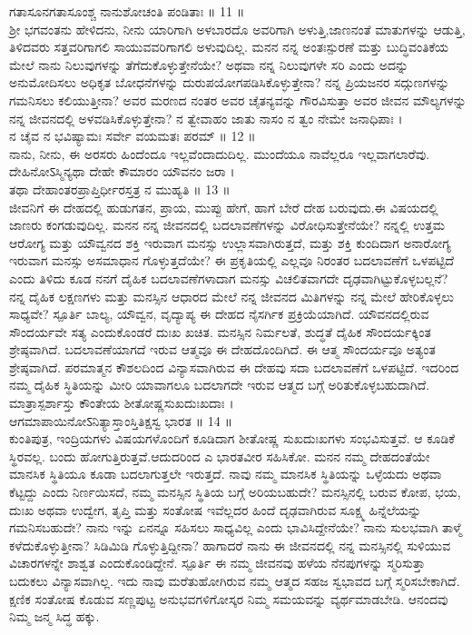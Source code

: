 ಗತಾಸೂನಗತಾಸೂಂಶ್ಚ ನಾನುಶೋಚಂತಿ ಪಂಡಿತಾಃ ॥ 11 ॥\\
 ಶ್ರೀ ಭಗವಂತನು ಹೇಳಿದನು,
 ನೀನು ಯಾರಿಗಾಗಿ ಅಳಬಾರದೊ ಅವರಿಗಾಗಿ ಅಳುತ್ತಿ,ಜಾಣನಂತೆ ಮಾತುಗಳನ್ನು ಆಡುತ್ತಿ, ತಿಳಿದವರು ಸತ್ತವರಿಗಾಗಲಿ ಸಾಯುವವರಿಗಾಗಲಿ ಅಳುವುದಿಲ್ಲ.
ಮನನ 
 ನನ್ನ ಅಂತಃಸ್ಪುರಣೆ ಮತ್ತು ಬುದ್ಧಿವಂತಿಕೆಯ ಮೇಲೆ ನಾನು ನಿಲುವುಗಳನ್ನು ತೆಗೆದುಕೊಳ್ಳುತ್ತೇನೆಯೇ? ಅಥವಾ ನನ್ನ ನಿಲುವುಗಳೇ ಸರಿ ಎಂದು ಅದನ್ನು ಅನುಮೋದಿಸಲು ಅಧಿಕೃತ ಬೋಧನೆಗಳನ್ನು ದುರುಪಯೋಗಪಡಿಸಿಕೊಳ್ಳುತ್ತೇನಾ?
   ನನ್ನ ಪ್ರಿಯಜನರ ಸದ್ಗುಣಗಳನ್ನು ಗಮನಿಸಲು ಕಲಿಯುತ್ತೀನಾ? ಅವರ ಮರಣದ ನಂತರ ಅವರ ಚೈತನ್ಯವನ್ನು ಗೌರವಿಸುತ್ತಾ ಅವರ ಜೀವನ ಮೌಲ್ಯಗಳನ್ನು ನನ್ನ ಜೀವನದಲ್ಲಿ ಅಳವಡಿಸಿಕೊಳ್ಳುತ್ತೇನಾ? 
ನ ತ್ವೇವಾಹಂ ಜಾತು ನಾಸಂ ನ ತ್ವಂ ನೇಮೇ ಜನಾಧಿಪಾಃ ।\\
ನ ಚೈವ ನ ಭವಿಷ್ಯಾಮಃ ಸರ್ವೇ ವಯಮತಃ ಪರಮ್ ॥ 12 ॥\\
 ನಾನು, ನೀನು, ಈ ಅರಸರು ಹಿಂದೆಂದೂ ಇಲ್ಲವೆಂದಾದುದಿಲ್ಲ. ಮುಂದೆಯೂ ನಾವೆಲ್ಲರೂ ಇಲ್ಲವಾಗಲಾರೆವು.
ದೇಹಿನೋऽಸ್ಮಿನ್ಯಥಾ ದೇಹೇ ಕೌಮಾರಂ ಯೌವನಂ ಜರಾ ।\\
ತಥಾ ದೇಹಾಂತರಪ್ರಾಪ್ತಿರ್ಧೀರಸ್ತತ್ರ ನ ಮುಹ್ಯತಿ ॥ 13 ॥\\
 ಜೀವನಿಗೆ ಈ ದೇಹದಲ್ಲಿ ಹುಡುಗತನ, ಪ್ರಾಯ, ಮುಪ್ಪು ಹೇಗೆ, ಹಾಗೆ ಬೇರೆ ದೇಹ ಬರುವುದು.ಈ ವಿಷಯದಲ್ಲಿ ಜಾಣರು ಕಂಗಡುವುದಿಲ್ಲ.
ಮನನ 
 ನನ್ನ ಜೀವನದಲ್ಲಿ ಬದಲಾವಣೆಗಳನ್ನು ವಿರೋಧಿಸುತ್ತೇನೆಯೇ? ನನ್ನಲ್ಲಿ ಉತ್ತಮ ಆರೋಗ್ಯ ಮತ್ತು ಯೌವ್ವನದ ಶಕ್ತಿ ಇರುವಾಗ ಮನಸ್ಸು ಉಲ್ಲಾಸವಾಗಿರುತ್ತದೆ, ಮತ್ತು ಶಕ್ತಿ ಕುಂದಿದಾಗ ಅನಾರೋಗ್ಯ ಇರುವಾಗ ಮನಸ್ಸು ಅಸಮಾಧಾನ ಗೊಳ್ಳುತ್ತದೆಯೇ? ಈ ಪ್ರಕೃತಿಯಲ್ಲಿ ಎಲ್ಲವೂ ನಿರಂತರ ಬದಲಾವಣೆಗೆ ಒಳಪಟ್ಟಿದೆ ಎಂದು ತಿಳಿದು ಕೂಡ ನನಗೆ ದೈಹಿಕ ಬದಲಾವಣೆಗಳಾದಾಗ ಮನಸ್ಸು ವಿಚಲಿತವಾಗದೇ ದೃಢವಾಗಿಟ್ಟುಕೊಳ್ಳಬಲ್ಲನೆ? ನನ್ನ ದೈಹಿಕ ಲಕ್ಷಣಗಳು ಮತ್ತು ಮನಸ್ಸಿನ ಆಧಾರದ ಮೇಲೆ ನನ್ನ ಜೀವನದ ಮಿತಿಗಳನ್ನು ನನ್ನ ಮೇಲೆ ಹೇರಿಕೊಳ್ಳಲು ಸಾಧ್ಯವೇ?
 ಸ್ಪೂರ್ತಿ 
 ಬಾಲ್ಯ, ಯೌವ್ವನ, ವೃದ್ಯಾಪ್ಯ ಈ ದೇಹದ ನೈಸರ್ಗಿಕ ಪ್ರಕ್ರಿಯೆಯಾಗಿದೆ. ಯೌವನದಲ್ಲಿರುವ ಸೌಂದರ್ಯವೇ ಸತ್ಯ ಎಂದುಕೊಂಡರೆ ದುಃಖ ಖಚಿತ. ಮನಸ್ಸಿನ ನಿರ್ಮಲತೆ, ಶುದ್ಧತೆ ದೈಹಿಕ ಸೌಂದರ್ಯಕ್ಕಿಂತ ಶ್ರೇಷ್ಠವಾಗಿದೆ. ಬದಲಾವಣೆಯಾಗದೆ ಇರುವ ಆತ್ಮವೂ ಈ ದೇಹದೊಂದಿಗಿದೆ. ಈ ಆತ್ಮ ಸೌಂದರ್ಯವೂ ಅತ್ಯಂತ ಶ್ರೇಷ್ಠವಾಗಿದೆ.
 ಪರಮಾತ್ಮನ ಕೌಶಲದಿಂದ ವಿನ್ಯಾಸವಾಗಿರುವ ಈ ದೇಹವು ಸದಾ ಬದಲಾವಣೆಗೆ ಒಳಪಟ್ಟಿದೆ. ಇದರಿಂದ ನಮ್ಮ ದೈಹಿಕ ಸ್ಥಿತಿಯನ್ನು ಮೀರಿ ಯಾವಾಗಲೂ ಬದಲಾಗದೇ ಇರುವ ಆತ್ಮದ ಬಗ್ಗೆ ಅರಿತುಕೊಳ್ಳಬಹುದಾಗಿದೆ.
ಮಾತ್ರಾಸ್ಪರ್ಶಾಸ್ತು ಕೌಂತೇಯ ಶೀತೋಷ್ಣಸುಖದುಃಖದಾಃ ।\\
ಆಗಮಾಪಾಯಿನೋऽನಿತ್ಯಾಸ್ತಾಂಸ್ತಿತಿಕ್ಷಸ್ವ ಭಾರತ ॥ 14 ॥\\
 ಕುಂತಿಪುತ್ರ, ಇಂದ್ರಿಯಗಳು ವಿಷಯಗಳೊಂದಿಗೆ ಕೂಡಿದಾಗ ಶೀತೋಷ್ಣ ಸುಖದುಃಖಗಳು ಸಂಭವಿಸುತ್ತವೆ. ಆ ಕೂಡಿಕೆ ಸ್ಥಿರವಲ್ಲ. ಬಂದು ಹೋಗುತ್ತಿರುತ್ತವೆ.ಆದುದರಿಂದ ಎ ಭಾರತವೀರ ಸಹಿಸಿಕೋ.
ಮನನ 
 ನಮ್ಮ ದೇಹದಂತೆಯೇ ಮಾನಸಿಕ ಸ್ಥಿತಿಯೂ ಕೂಡಾ ಬದಲಾಗುತ್ತಲೇ ಇರುತ್ತದೆ. ನಾವು ನಮ್ಮ ಮಾನಸಿಕ ಸ್ಥಿತಿಯನ್ನು ಒಳ್ಳೆಯದು ಅಥವಾ ಕೆಟ್ಟದ್ದು ಎಂದು ನಿರ್ಣಯಿಸದೆ, ನಮ್ಮ ಮನಸ್ಸಿನ ಸ್ಥಿತಿಯ ಬಗ್ಗೆ ಅರಿಯಬಹುದೇ? ಮನಸ್ಸಿನಲ್ಲಿ ಬರುವ ಕೋಪ, ಭಯ, ದುಃಖ ಅಥವಾ ಉದ್ವೇಗ, ತೃಪ್ತಿ ಮತ್ತು ಸಂತೋಷ ಇವೆಲ್ಲದರ ಹಿಂದೆ ದೃಢವಾಗಿರುವ ಸೂಕ್ಷ್ಮ ಹಿನ್ನೆಲೆಯನ್ನು  ಗಮನಿಸಬಹುದೇ?
 ನಾನು ಇನ್ನು ಏನನ್ನೂ ಸಹಿಸಲು ಸಾಧ್ಯವಿಲ್ಲ ಎಂದು ಭಾವಿಸಿದ್ದೇನೆಯೇ? ನಾನು ಸುಲಭವಾಗಿ ತಾಳ್ಮೆ ಕಳೆದುಕೊಳ್ಳುತ್ತೀನಾ? ಸಿಡಿಮಿಡಿ ಗೊಳ್ಳುತ್ತಿದ್ದೀನಾ?  ಹಾಗಾದರೆ ನಾನು ಈ ಜೀವನದಲ್ಲಿ ನನ್ನ ಮನಸ್ಸಿನಲ್ಲಿ ಸುಳಿಯುವ ವಿಚಾರಗಳನ್ನೇ ಶಾಶ್ವತ ಎಂದುಕೊಂಡಿದ್ದೇನೆ.
 ಸ್ಪೂರ್ತಿ 
 ಈ ನಮ್ಮ ಜೀವನವು ಹಳೆಯ ನೆನಪುಗಳನ್ನು ಸ್ಮರಿಸುತ್ತಾ ಬದುಕಲು ವಿನ್ಯಾಸವಾಗಿಲ್ಲ. ಇದು ನಾವು ಮರೆತುಹೋಗಿರುವ ನಮ್ಮ ಆತ್ಮದ ಸಹಜ ಸ್ವಭಾವದ ಬಗ್ಗೆ ಸ್ಮರಿಸಬೇಕಾಗಿದೆ. ಕ್ಷಣಿಕ ಸಂತೋಷ ಕೊಡುವ ಸಣ್ಣಪುಟ್ಟ ಅನುಭವಗಳಿಗೋಸ್ಕರ ನಿಮ್ಮ ಸಮಯವನ್ನು ವ್ಯರ್ಥಮಾಡಬೇಡಿ.  ಆನಂದವು ನಿಮ್ಮ ಜನ್ಮ ಸಿದ್ಧ ಹಕ್ಕು.

